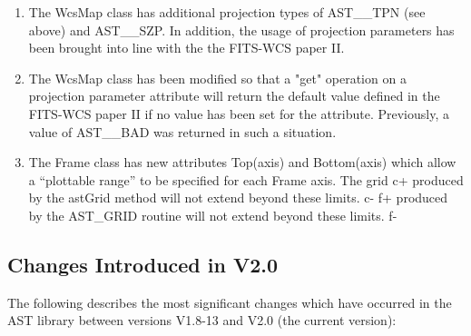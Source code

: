 \documentclass[twoside,11pt]{article}
\newcommand{\xlabel}[1]{}
\begin{document}
\begin{enumerate}
\item The WcsMap class has additional projection types of AST\_\_TPN (see
above) and AST\_\_SZP. In addition, the usage of projection parameters
has been brought into line with the the FITS-WCS paper II. 

\item The WcsMap class has been modified so that a "get" operation on a
projection parameter attribute will return the default value defined in the
FITS-WCS paper II if no value has been set for the attribute. Previously, a
value of AST\_\_BAD was returned in such a situation.

\item The Frame class has new attributes Top(axis) and Bottom(axis) which
allow a ``plottable range'' to be specified for each Frame axis. The grid
c+
produced by the astGrid method will not extend beyond these limits.
c-
f+
produced by the AST\_GRID routine will not extend beyond these limits.
f-

\end{enumerate}

\subsection{\xlabel{changes}\xlabel{list_of_most_recent_changes}Changes
Introduced in V2.0}

The following describes the most significant changes which have
occurred in the AST library between versions V1.8-13 and V2.0 (the
current version):
\end{document}
